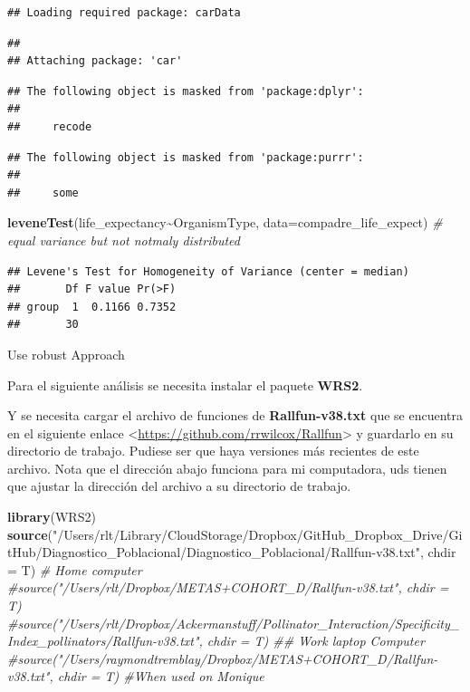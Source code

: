 \documentclass[
]{book}
\newenvironment{Shaded}{\begin{snugshade}}{\end{snugshade}}
\newcommand{\AttributeTok}[1]{\textcolor[rgb]{0.13,0.29,0.53}{#1}}
\newcommand{\CommentTok}[1]{\textcolor[rgb]{0.56,0.35,0.01}{\textit{#1}}}
\newcommand{\FunctionTok}[1]{\textcolor[rgb]{0.13,0.29,0.53}{\textbf{#1}}}
\newcommand{\NormalTok}[1]{#1}
\newcommand{\SpecialCharTok}[1]{\textcolor[rgb]{0.81,0.36,0.00}{\textbf{#1}}}
\newcommand{\StringTok}[1]{\textcolor[rgb]{0.31,0.60,0.02}{#1}}
\theoremstyle{definition}
\theoremstyle{definition}
\theoremstyle{definition}
\theoremstyle{definition}
\theoremstyle{remark}
\begin{document}
\begin{verbatim}
## Loading required package: carData
\end{verbatim}

\begin{verbatim}
## 
## Attaching package: 'car'
\end{verbatim}

\begin{verbatim}
## The following object is masked from 'package:dplyr':
## 
##     recode
\end{verbatim}

\begin{verbatim}
## The following object is masked from 'package:purrr':
## 
##     some
\end{verbatim}

\begin{Shaded}
\begin{Highlighting}[]
\FunctionTok{leveneTest}\NormalTok{(life\_expectancy}\SpecialCharTok{\textasciitilde{}}\NormalTok{OrganismType, }\AttributeTok{data=}\NormalTok{compadre\_life\_expect) }\CommentTok{\# equal variance but not notmaly distributed}
\end{Highlighting}
\end{Shaded}

\begin{verbatim}
## Levene's Test for Homogeneity of Variance (center = median)
##       Df F value Pr(>F)
## group  1  0.1166 0.7352
##       30
\end{verbatim}

Use robust Approach

Para el siguiente análisis se necesita instalar el paquete \textbf{WRS2}.

Y se necesita cargar el archivo de funciones de \textbf{Rallfun-v38.txt} que se encuentra en el siguiente enlace \textless{}\url{https://github.com/rrwilcox/Rallfun}\textgreater{} y guardarlo en su directorio de trabajo. Pudiese ser que haya versiones más recientes de este archivo. Nota que el dirección abajo funciona para mi computadora, uds tienen que ajustar la dirección del archivo a su directorio de trabajo.

\begin{Shaded}
\begin{Highlighting}[]
\FunctionTok{library}\NormalTok{(WRS2)}
\FunctionTok{source}\NormalTok{(}\StringTok{"/Users/rlt/Library/CloudStorage/Dropbox/GitHub\_Dropbox\_Drive/GitHub/Diagnostico\_Poblacional/Diagnostico\_Poblacional/Rallfun{-}v38.txt"}\NormalTok{, }\AttributeTok{chdir =}\NormalTok{ T) }\CommentTok{\# Home computer}
\CommentTok{\#source("/Users/rlt/Dropbox/METAS+COHORT\_D/Rallfun{-}v38.txt", chdir = T)}
\CommentTok{\#source("/Users/rlt/Dropbox/Ackermanstuff/Pollinator\_Interaction/Specificity\_Index\_pollinators/Rallfun{-}v38.txt", chdir = T) \#\# Work laptop Computer}
\CommentTok{\#source("/Users/raymondtremblay/Dropbox/METAS+COHORT\_D/Rallfun{-}v38.txt", chdir = T) \#When used on Monique}
\end{Highlighting}
\end{Shaded}
\end{document}
